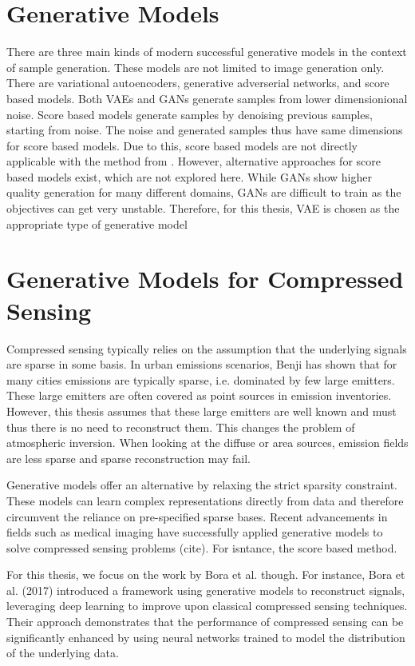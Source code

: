 \section{Generative Models}
There are three main kinds of modern successful generative models in the context of sample generation.
These models are not limited to image generation only.
There are variational autoencoders, generative adverserial networks, and score based models.
Both VAEs and GANs generate samples from lower dimensionional noise.
Score based models generate samples by denoising previous samples, starting from noise.
The noise and generated samples thus have same dimensions for score based models.
Due to this, score based models are not directly applicable with the method from \parencite{CSUsingAI}.
However, alternative approaches for score based models exist, which are not explored here.
While GANs show higher quality generation for many different domains, GANs are difficult to train as the objectives can get very unstable.
Therefore, for this thesis, VAE is chosen as the appropriate type of generative model

\section{Generative Models for Compressed Sensing}
Compressed sensing typically relies on the assumption that the underlying signals are sparse in some basis.
In urban emissions scenarios, Benji has shown that for many cities emissions are typically sparse, i.e. dominated by few large emitters.
These large emitters are often covered as point sources in emission inventories.
However, this thesis assumes that these large emitters are well known and must thus there is no need to reconstruct them.
This changes the problem of atmospheric inversion.
When looking at the diffuse or area sources, emission fields are less sparse and sparse reconstruction may fail.

Generative models offer an alternative by relaxing the strict sparsity constraint.
These models can learn complex representations directly from data and therefore circumvent the reliance on pre-specified sparse bases.
Recent advancements in fields such as medical imaging have successfully applied generative models to solve compressed sensing problems (cite).
For isntance, the score based method.

For this thesis, we focus on the work by Bora et al. though.
For instance, Bora et al. (2017) introduced a framework using generative models to reconstruct signals, leveraging deep learning to improve upon classical compressed sensing techniques.
Their approach demonstrates that the performance of compressed sensing can be significantly enhanced by using neural networks trained to model the distribution of the underlying data.

